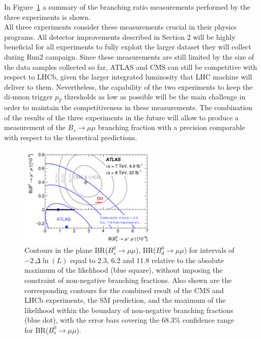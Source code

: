 In Figure~\ref{fig:BsBd} a summary of the branching ratio measurements performed by the three experiments is shown.\\
All three experiments consider these measurements crucial in their physics programs. All detector improvements described in Section 2 will be highly beneficial for all experiments to fully exploit the larger dataset they will collect during Run2 campaign. Since these measurements are still limited by the size of the data samples collected so far, ATLAS and CMS can still be competitive with respect to LHCb, given the larger integrated luminosity that LHC machine will deliver to them. Nevertheless, the capability of the two experiments to keep the di-muon trigger $p_T$ thresholds as low as possible will be the main challenge in order to maintain the competitiveness in these measurements. The combination of the results of the three experiments in the future will allow to produce a measurement of the $B_s \to \mu \mu$  branching fraction with a precision comparable with respect to the theoretical predictions.

\begin{figure}[!t]
  \begin{center}
    \includegraphics[width=0.6\textwidth]{fig_09.png}
    \caption
        {Contours in the plane  BR($B^0_s \to \mu \mu$), BR($B^0_d \to \mu \mu$) for intervals of
          $-2\, \Delta \ln(L)$ equal to $2.3$, $6.2$ and $11.8$ relative to the absolute maximum 
          of the likelihood (blue square), without imposing the constraint of non-negative branching fractions. 
          Also shown are the corresponding contours for the combined result of the CMS and LHCb 
          experiments, the SM prediction, and the maximum of the likelihood within the boundary of non-negative 
          branching fractions (blue dot), with the error bars covering the 68.3\% confidence range for BR($B^0_s \to \mu \mu$).}
        \label{fig:BsBd}
  \end{center}
\end{figure}

